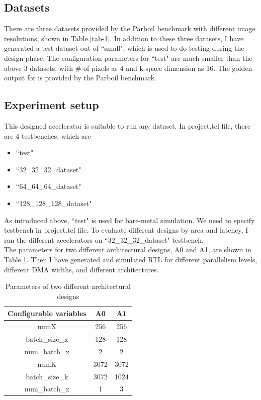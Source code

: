 \documentclass{sig-alternate}
\begin{document}
\subsection{Datasets}

There are three datasets provided by the Parboil benchmark with different image resolutions, shown in Table.\ref{tab-1}. In addition to these three datasets, I have generated a test dataset out of ``small", which is used to do testing during the design phase. The configuration parameters for ``test" are much smaller than the above 3 datasets, with \# of pixels as 4 and k-space dimension as 16. The golden output for is provided by the Parboil benchmark. 

\subsection{Experiment setup}
 This designed accelerator is suitable to run any dataset. In project.tcl file, there are 4 testbenches, which are
 \begin{itemize}
 \setlength\itemsep{-0.15em}
     \item ``test" 
     \item ``32\_32\_32\_dataset"
     \item  ``64\_64\_64\_dataset"
     \item  ``128\_128\_128\_dataset"
 \end{itemize}
 As introduced above, ``test" is used for bare-metal simulation. We need to specify testbench in project.tcl file. To evaluate different designs by area and latency, I ran the different accelerators on ``32\_32\_32\_dataset" testbench. \\
 
 The parameters for two different architectural designs, A0 and A1, are shown in Table.\ref{tab-2}. Then I have generated and simulated RTL for different parallelism levels, different DMA widths, and different architectures. 
 \begin{table}[h!]
     \centering
     \begin{tabular}{c|c|c}
        \hline
          Configurable variables& A0 & A1  \\
         \hline
         numX & 256 & 256 \\
         \hline
         batch\_size\_x & 128 & 128 \\
         \hline
         num\_batch\_x & 2 & 2 \\
          \hline
         numK & 3072 & 3072 \\  
         \hline
         batch\_size\_k & 3072 & 1024 \\
         \hline
         num\_batch\_x & 1 & 3 \\
         \hline
     \end{tabular}
     \caption{Parameters of two different architectural designs}
     \label{tab-2}
 \end{table}
 
\end{document}
